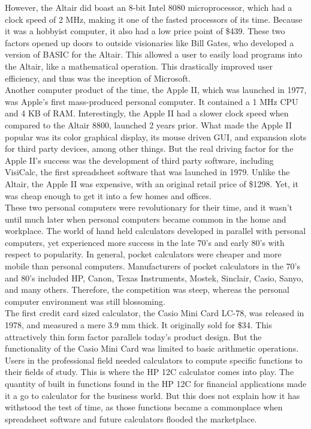 \documentclass{article}
\begin{document}
However, the Altair did boast an 8-bit Intel 8080 microprocessor, which had a clock speed of 2 MHz, making it one of the fasted processors of its time.  Because it was a hobbyist computer, it also had a low price point of \$439.   These two factors opened up doors to outside visionaries like Bill Gates, who developed a version of BASIC for the Altair. This allowed a user to easily load programs into the Altair, like a mathematical operation.  This drastically improved user efficiency, and thus was the inception of Microsoft.\\

Another computer product of the time, the Apple II, which was launched in 1977, was Apple’s first mass-produced personal computer.  It contained a 1 MHz CPU and 4 KB of RAM.  Interestingly, the Apple II had a slower clock speed when compared to the Altair 8800, launched 2 years prior.  What made the Apple II popular was its color graphical display, its mouse driven GUI, and expansion slots for third party devices, among other things.  But the real driving factor for the Apple II’s success was the development of third party software, including VisiCalc, the first spreadsheet software that was launched in 1979.  Unlike the Altair, the Apple II was expensive, with an original retail price of \$1298.  Yet, it was cheap enough to get it into a few homes and offices.\\

These two personal computers were revolutionary for their time, and it wasn’t until much later when personal computers became common in the home and workplace.  The world of hand held calculators developed in parallel with personal computers, yet experienced more success in the late 70’s and early 80’s with respect to popularity.  In general, pocket calculators were cheaper and more mobile than personal computers.  Manufacturers of pocket calculators in the 70’s and 80’s included HP, Canon, Texas Instruments, Mostek, Sinclair, Casio, Sanyo, and many others.  Therefore, the competition was steep, whereas the personal computer environment was still blossoming.\\

The first credit card sized calculator, the Casio Mini Card LC-78, was released in 1978, and measured a mere 3.9 mm thick.  It originally sold for \$34.  This attractively thin form factor parallels today’s product design.  But the functionality of the Casio Mini Card was limited to basic arithmetic operations.  Users in the professional field needed calculators to compute specific functions to their fields of study.  This is where the HP 12C calculator comes into play.  The quantity of built in functions found in the HP 12C for financial applications made it a go to calculator for the business world.  But this does not explain how it has withstood the test of time, as those functions became a commonplace when spreadsheet software and future calculators flooded the marketplace.
\end{document}

